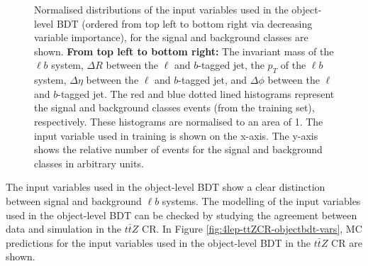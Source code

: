 \begin{figure}[h!]
  
    \caption{Normalised distributions of the input variables used in the object-level BDT (ordered from top left to bottom right via decreasing variable importance), for the signal and background classes are shown. \textbf{From top left to bottom right:} The invariant mass of the $\ell b$ system, $\Delta R$ between the $\ell$ and $b$-tagged jet, the $p_{T}$ of the $\ell b$ system, $\Delta \eta$ between the $\ell$ and $b$-tagged jet, and $\Delta \phi$ between the $\ell$ and $b$-tagged jet. The red and blue dotted lined histograms represent the signal and background classes events (from the training set), respectively. These histograms are normalised to an area of 1. The input variable used in training is shown on the x-axis. The y-axis shows the relative number of events for the signal and background classes in arbitrary units. }
    \label{fig:norm-object-bdt-vars}
\end{figure}The input variables used in the object-level BDT show a clear distinction between signal and background $\ell b$ systems. The modelling of the input variables used in the object-level BDT can be checked by studying the agreement between data and simulation in the $t\bar{t}Z$ CR. In Figure \ref{fig:4lep-ttZCR-objectbdt-vars}, MC predictions for the input variables used in the object-level BDT in the $t\bar{t}Z$ CR are shown.
